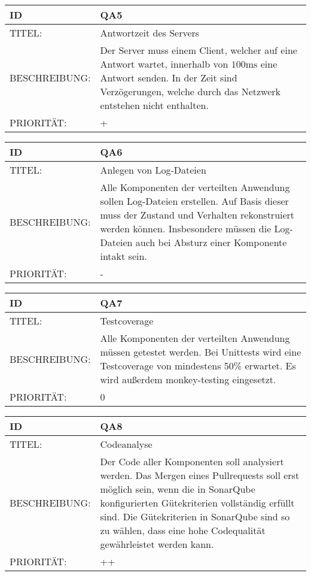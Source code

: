 \begin{tabularx}{16cm}{l|X}
	 \textbf{ID} & \textbf{QA5} \\
	 \hline
		TITEL: & Antwortzeit des Servers\\ 
	 \hline 
	 BESCHREIBUNG: & Der Server muss einem Client, welcher auf eine Antwort wartet, innerhalb von $100\si{\milli\second}$ eine Antwort senden. In der Zeit sind Verzögerungen, welche durch das Netzwerk entstehen nicht enthalten.\\
	 \hline
	 PRIORITÄT: & +\\
\end{tabularx} 


\begin{tabularx}{16cm}{l|X}
	 \textbf{ID} & \textbf{QA6} \\
	 \hline
		TITEL: & Anlegen von Log-Dateien\\ 
	 \hline 
	 BESCHREIBUNG: & Alle Komponenten der verteilten Anwendung sollen Log-Dateien erstellen. Auf Basis dieser muss der Zustand und Verhalten rekonstruiert werden können. Insbesondere müssen die Log-Dateien auch bei Absturz einer Komponente intakt sein.\\ 
	 \hline 
	 PRIORITÄT: & -\\
\end{tabularx} 


\begin{tabularx}{16cm}{l|X}
	 \textbf{ID} & \textbf{QA7} \\
	 \hline
		TITEL: & Testcoverage\\ 
	 \hline 
	 BESCHREIBUNG: & Alle Komponenten der verteilten Anwendung müssen getestet werden. Bei Unittests wird eine Testcoverage von mindestens 50\% erwartet. Es wird außerdem monkey-testing eingesetzt.\\ 
	 \hline
	 PRIORITÄT: & 0\\
\end{tabularx} 



\begin{tabularx}{16cm}{l|X}
	 \textbf{ID} & \textbf{QA8} \\
	 \hline
		TITEL: & Codeanalyse\\ 
	 \hline 
	 BESCHREIBUNG: & Der Code aller Komponenten soll analysiert werden. Das Mergen eines Pullrequests soll erst möglich sein, wenn die in SonarQube konfigurierten Gütekriterien vollständig erfüllt sind. Die Gütekriterien in SonarQube sind so zu wählen, dass eine hohe Codequalität gewährleistet werden kann.\\ 
	 \hline
	 PRIORITÄT: & ++\\
\end{tabularx} 


